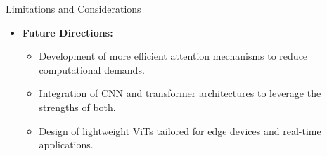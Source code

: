 \begin{frame}[allowframebreaks]{Limitations and Considerations}
    \framebreak

    \begin{itemize}
        \item \textbf{Future Directions:}
        \begin{itemize}
            \item Development of more efficient attention mechanisms to reduce computational demands.
            \item Integration of CNN and transformer architectures to leverage the strengths of both.
            \item Design of lightweight ViTs tailored for edge devices and real-time applications.
        \end{itemize}
    \end{itemize}
\end{frame}